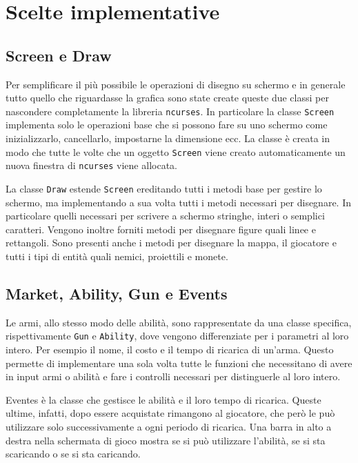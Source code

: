 \documentclass[a4paper]{article}
\begin{document}
\section{Scelte implementative}
\subsection{Screen e Draw}
Per semplificare il più possibile le operazioni di disegno su schermo e in 
generale tutto quello che riguardasse la grafica sono state create queste due
classi per nascondere completamente la libreria \texttt{ncurses}. In particolare
la classe \texttt{Screen} implementa solo le operazioni base che si possono fare
su uno schermo come inizializzarlo, cancellarlo, impostarne la dimensione ecc.
La classe è creata in modo che tutte le volte che un oggetto \texttt{Screen} 
viene creato automaticamente un nuova finestra di \texttt{ncurses} viene 
allocata.

La classe \texttt{Draw} estende \texttt{Screen} ereditando tutti i metodi base
per gestire lo schermo, ma implementando a sua volta tutti i metodi necessari 
per disegnare. In particolare quelli necessari per scrivere a schermo stringhe, 
interi o semplici caratteri. Vengono inoltre forniti metodi per disegnare figure 
quali linee e rettangoli. Sono presenti anche i metodi per disegnare la mappa, 
il giocatore e tutti i tipi di entità quali nemici, proiettili e monete.

\subsection{Market, Ability, Gun e Events}
Le armi, allo stesso modo delle abilità, sono rappresentate da una classe 
specifica, rispettivamente \texttt{Gun} e \texttt{Ability}, dove vengono
differenziate per i parametri al loro intero. Per esempio il nome, il costo e il 
tempo di ricarica di un'arma. Questo permette di implementare una sola volta 
tutte le funzioni che necessitano di avere in input armi o abilità e fare i 
controlli necessari per distinguerle al loro intero.

Eventes è la classe che gestisce le abilità e il loro tempo di ricarica. Queste
ultime, infatti, dopo essere acquistate rimangono al giocatore, che però le può
utilizzare solo successivamente a ogni periodo di ricarica. Una barra in alto a
destra nella schermata di gioco mostra se si può utilizzare l'abilità, se si sta
scaricando o se si sta caricando.
\end{document}
